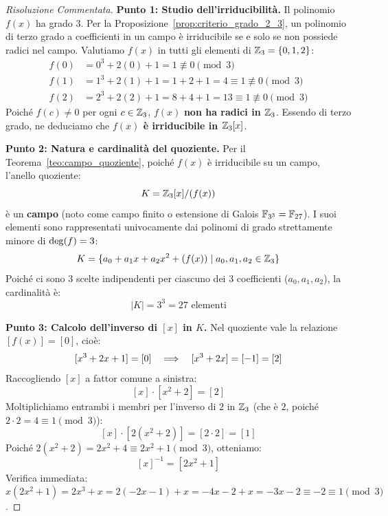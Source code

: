 \begin{proof}[Risoluzione Commentata]
\textbf{Punto 1: Studio dell'irriducibilità.}
Il polinomio $f(x)$ ha grado $3$. Per la Proposizione~\ref{prop:criterio_grado_2_3}, un polinomio di terzo grado a coefficienti in un campo è irriducibile se e solo se non possiede radici nel campo.
Valutiamo $f(x)$ in tutti gli elementi di $\mathbb{Z}_3 = \{0, 1, 2\}$:
\begin{align*}
    f(0) &= 0^3 + 2(0) + 1 = 1 \not\equiv 0 \pmod 3 \\
    f(1) &= 1^3 + 2(1) + 1 = 1 + 2 + 1 = 4 \equiv 1 \not\equiv 0 \pmod 3 \\
    f(2) &= 2^3 + 2(2) + 1 = 8 + 4 + 1 = 13 \equiv 1 \not\equiv 0 \pmod 3
\end{align*}
Poiché $f(c) \neq 0$ per ogni $c \in \mathbb{Z}_3$, $f(x)$ \textbf{non ha radici in $\mathbb{Z}_3$}.
Essendo di terzo grado, ne deduciamo che \textbf{$f(x)$ è irriducibile in $\mathbb{Z}_3[x]$}.

\textbf{Punto 2: Natura e cardinalità del quoziente.}
Per il Teorema~\ref{teo:campo_quoziente}, poiché $f(x)$ è irriducibile su un campo, l'anello quoziente:
\[
    K = \mathbb{Z}_3[x]/(f(x))
\]
è un \textbf{campo} (noto come campo finito o estensione di Galois $\mathbb{F}_{3^3} = \mathbb{F}_{27}$).
I suoi elementi sono rappresentati univocamente dai polinomi di grado strettamente minore di $\operatorname{deg}(f) = 3$:
\[
    K = \{a_0 + a_1 x + a_2 x^2 + (f(x)) \mid a_0, a_1, a_2 \in \mathbb{Z}_3\}
\]
Poiché ci sono 3 scelte indipendenti per ciascuno dei 3 coefficienti ($a_0, a_1, a_2$), la cardinalità è:
\[
    |K| = 3^3 = 27 \text{ elementi}
\]

\textbf{Punto 3: Calcolo dell'inverso di $[x]$ in $K$.}
Nel quoziente vale la relazione $[f(x)] = [0]$, cioè:
\[
    [x^3 + 2x + 1] = [0] \quad \Longrightarrow \quad [x^3 + 2x] = [-1] = [2]
\]
Raccogliendo $[x]$ a fattor comune a sinistra:
\[
    [x] \cdot [x^2 + 2] = [2]
\]
Moltiplichiamo entrambi i membri per l'inverso di $2$ in $\mathbb{Z}_3$ (che è $2$, poiché $2 \cdot 2 = 4 \equiv 1 \pmod 3$):
\[
    [x] \cdot [2(x^2 + 2)] = [2 \cdot 2] = [1]
\]
Poiché $2(x^2 + 2) = 2x^2 + 4 \equiv 2x^2 + 1 \pmod 3$, otteniamo:
\[
    [x]^{-1} = [2x^2 + 1]
\]
Verifica immediata: $x(2x^2 + 1) = 2x^3 + x = 2(-2x - 1) + x = -4x - 2 + x = -3x - 2 \equiv -2 \equiv 1 \pmod 3$.
\end{proof}
